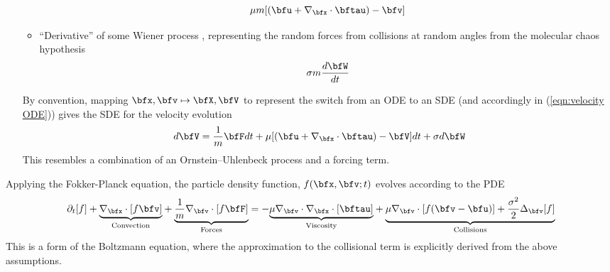 \begin{itemize}
\begin{itemize}
            \begin{equation}\label{eqn:single-phase drag force}
                \mu m[(\bfu + \nabla_{\bfx}\cdot\bftau) - \bfv]
            \end{equation}
            \item  ``Derivative'' of some Wiener process , representing the random forces from collisions at random angles from the molecular chaos hypothesis
            \begin{equation}\label{eqn:single-phase brownian motion}
                \sigma m\frac{d\bfW}{dt}
            \end{equation}
        \end{itemize}
        
        
        By convention, mapping $\bfx, \bfv  \mapsto  \bfX, \bfV$ to represent the switch from an ODE to an SDE (and accordingly in (\ref{eqn:velocity ODE})) gives the SDE for the velocity evolution
        \begin{equation}
            d\bfV  =  \frac{1}{m}\bfF dt + \mu[(\bfu + \nabla_{\bfx}\cdot\bftau) - \bfV]dt + \sigma d\bfW
        \end{equation}
        This resembles a combination of an Ornstein–Uhlenbeck process and a forcing term.
    \end{itemize}
    Applying the Fokker-Planck equation, the particle density function, $f(\bfx, \bfv; t)$ evolves according to the PDE
    \begin{equation}\label{eqn:single-phase Boltzmann equation}
        \partial_{t}[f] + \underset{\textrm{Convection}}{\underbrace{\nabla_{\bfx}\cdot[f\bfv]}} + \underset{\textrm{Forces}}{\underbrace{\frac{1}{m}\nabla_{\bfv}\cdot[f\bfF]}}  =  - \underset{\textrm{Viscosity}}{\underbrace{\mu\nabla_{\bfv}\cdot\nabla_{\bfx}\cdot[\bftau]}} + \underset{\textrm{Collisions}}{\underbrace{\mu\nabla_{\bfv}\cdot[f(\bfv - \bfu)] + \frac{\sigma^{2}}{2}\Delta_{\bfv}[f]}}
    \end{equation}
    This is a form of the Boltzmann equation, where the approximation to the collisional term is explicitly derived from the above assumptions.